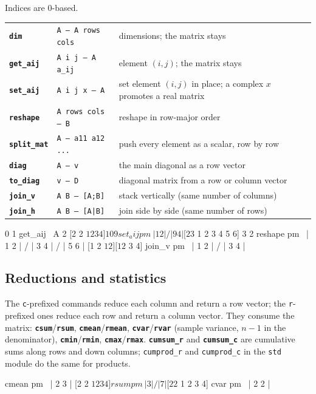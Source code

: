 \documentclass[11pt,letterpaper]{article}
\newcommand{\code}[1]{\texttt{#1}}
\newcommand{\cmd}[1]{\texttt{\textbf{#1}}}
\newcommand{\stk}[1]{\texttt{#1}}
\begin{document}
Indices are 0-based.
\begin{center}
\begin{tabular}{@{}llp{}@{}}
\toprule
\cmd{dim}       & \stk{A -- A rows cols} & dimensions; the matrix stays \\
\cmd{get\_aij}  & \stk{A i j -- A a\_ij}  & element $(i,j)$; the matrix stays \\
\cmd{set\_aij}  & \stk{A i j x -- A}     & set element $(i,j)$ in place; a complex $x$ promotes a real matrix \\
\cmd{reshape}   & \stk{A rows cols -- B} & reshape in row-major order \\
\cmd{split\_mat} & \stk{A -- a11 a12 ...} & push every element as a scalar, row by row \\
\cmd{diag}      & \stk{A -- v}    & the main diagonal as a row vector \\
\cmd{to\_diag}  & \stk{v -- D}    & diagonal matrix from a row or column vector \\
\cmd{join\_v}   & \stk{A B -- [A;B]} & stack vertically (same number of columns) \\
\cmd{join\_h}   & \stk{A B -- [A|B]}  & join side by side (same number of rows) \\
\bottomrule
\end{tabular}
\end{center}
\begin{rpn}
[2 2 $ 1 2 3 4] 0 1 get_aij        \ A 2
[2 2 $ 1 2 3 4] 1 0 9 set_aij pm   \ | 1 2 | / | 9 4 |
[2 3 $ 1 2 3 4 5 6] 3 2 reshape pm \ | 1 2 | / | 3 4 | / | 5 6 |
[1 2 $ 1 2] [1 2 $ 3 4] join_v pm  \ | 1 2 | / | 3 4 |
\end{rpn}

\subsection{Reductions and statistics}

The \code{c}-prefixed commands reduce each column and return a row vector; the \code{r}-prefixed ones reduce each row and return a column vector. They consume the matrix: \cmd{csum}/\cmd{rsum}, \cmd{cmean}/\cmd{rmean}, \cmd{cvar}/\cmd{rvar} (sample variance, $n-1$ in the denominator), \cmd{cmin}/\cmd{rmin}, \cmd{cmax}/\cmd{rmax}. \cmd{cumsum\_r} and \cmd{cumsum\_c} are cumulative sums along rows and down columns; \code{cumprod\_r} and \code{cumprod\_c} in the \code{std} module do the same for products.
\begin{rpn}
[2 2 $ 1 2 3 4] cmean pm       \ | 2 3 |
[2 2 $ 1 2 3 4] rsum pm        \ | 3 | / | 7 |
[2 2 $ 1 2 3 4] cvar pm        \ | 2 2 |
\end{rpn}
\end{document}
